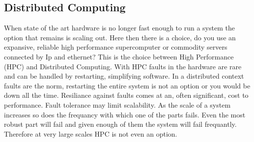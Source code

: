 \subsection{Distributed Computing}
When state of the art hardware is no longer fast enough to run a system the option that remains is scaling out. Here then there is a choice, do you use an expansive, reliable high performance supercomputer or commodity servers connected by Ip and ethernet? This is the choice between High Performance (HPC) and Distributed Computing. With HPC faults in the hardware are rare and can be handled by restarting, simplifying software. In a distributed context faults are the norm, restarting the entire system is not an option or you would be down all the time. Resiliance against faults comes at an, often significant, cost to performance. Fault tolerance may limit scalability. As the scale of a system increases so does the frequancy with which one of the parts fails. Even the most robust part will fail and given enough of them the system will fail frequantly. Therefore at very large scales HPC is not even an option. 
